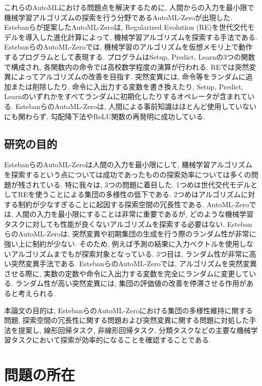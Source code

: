 \documentclass[11pt,oneside,openany,report]{jsbook}
\begin{document}
これらのAutoMLにおける問題点を解決するために, 人間からの入力を最小限で機械学習アルゴリズムの探索を行う分野であるAutoML-Zeroが出現した\cite{automl_zero}. Estebanらが提案したAutoML-Zeroは, Regularized Evolution (RE)を世代交代モデルを導入した進化計算によって, 機械学習アルゴリズムを探索する手法である. EstebanらのAutoML-Zeroでは, 機械学習のアルゴリズムを仮想メモリ上で動作するプログラムとして表現する. プログラムはSetup, Predict, Learnの3つの関数で構成され, 各関数内の命令では高校数学程度の演算が行われる. REでは突然変異によってアルゴリズムの改善を目指す. 突然変異には, 命令等をランダムに追加または削除したり, 命令に入出力する変数を書き換えたり, Setup, Predict, Learnのいずれかをすべてランダムに初期化したりするオペレータが含まれている. EstebanらのAutoML-Zeroは, 人間による事前知識はほとんど使用していないにも関わらず, 勾配降下法やReLU関数の再発明に成功している\cite{automl_zero}.

\section{研究の目的}\label{chap:intr:purpose}

EstebanらのAutoML-Zeroは人間の入力を最小限にして, 機械学習アルゴリズムを探索するという点については成功であったものの探索効率については多くの問題が残されている. 特に我々は, 3つの問題に着目した. 1つめは世代交代モデルとしてREを使うことによる集団の多様性の低下である. 2つめはアルゴリズムに対する制約が少なすぎることに起因する探索空間の冗長性である. AutoML-Zeroでは, 人間の入力を最小限にすることは非常に重要であるが, どのような機械学習タスクに対しても性能が良くないアルゴリズムを探索する必要はない. EstebanらのAutoML-Zeroは, 突然変異や初期集団の生成を行う際のランダム性が非常に強い上に制約が少ない. そのため, 例えば予測の結果に入力ベクトルを使用しないアルゴリズムまでもが探索対象となっている. 3つ目は, ランダム性が非常に高い突然変異手法である. EstebanらのAutoML-Zeroでは, アルゴリズムを突然変異させる際に, 実数の定数や命令に入出力する変数を完全にランダムに変更している. ランダム性が高い突然変異には, 集団の評価値の改善を停滞させる作用があると考えられる.

本論文の目的は, EstebanらのAutoML-Zeroにおける集団の多様性維持に関する問題, 探索空間の冗長性に関する問題および突然変異に関する問題に対処した手法を提案し, 線形回帰タスク, 非線形回帰タスク, 分類タスクなどの主要な機械学習タスクにおいて探索が効率的になることを確認することである.

\chapter{問題の所在}\label{chap:problem}
\end{document}
